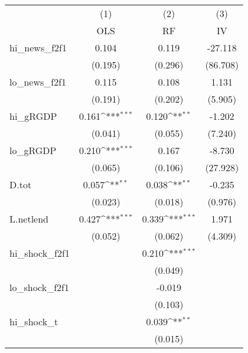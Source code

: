 {
\def\sym#1{\ifmmode^{#1}\else\(^{#1}\)\fi}
\begin{tabular}{l*{3}{c}}
\toprule
            &\multicolumn{1}{c}{(1)}&\multicolumn{1}{c}{(2)}&\multicolumn{1}{c}{(3)}\\
            &\multicolumn{1}{c}{OLS}&\multicolumn{1}{c}{RF}&\multicolumn{1}{c}{IV}\\
\midrule
hi\_news\_f2f1&       0.104         &       0.119         &     -27.118         \\
            &     (0.195)         &     (0.296)         &    (86.708)         \\
\addlinespace
lo\_news\_f2f1&       0.115         &       0.108         &       1.131         \\
            &     (0.191)         &     (0.202)         &     (5.905)         \\
\addlinespace
hi\_gRGDP    &       0.161\sym{***}&       0.120\sym{**} &      -1.202         \\
            &     (0.041)         &     (0.055)         &     (7.240)         \\
\addlinespace
lo\_gRGDP    &       0.210\sym{***}&       0.167         &      -8.730         \\
            &     (0.065)         &     (0.106)         &    (27.928)         \\
\addlinespace
D.tot       &       0.057\sym{**} &       0.038\sym{**} &      -0.235         \\
            &     (0.023)         &     (0.018)         &     (0.976)         \\
\addlinespace
L.netlend   &       0.427\sym{***}&       0.339\sym{***}&       1.971         \\
            &     (0.052)         &     (0.062)         &     (4.309)         \\
\addlinespace
hi\_shock\_f2f1&                     &       0.210\sym{***}&                     \\
            &                     &     (0.049)         &                     \\
\addlinespace
lo\_shock\_f2f1&                     &      -0.019         &                     \\
            &                     &     (0.103)         &                     \\
\addlinespace
hi\_shock\_t  &                     &       0.039\sym{**} &                     \\
            &                     &     (0.015)         &                     \\

\end{tabular}}
